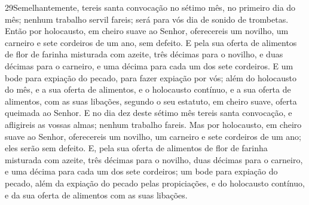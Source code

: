 \medskip

\lettrine{29} Semelhantemente, tereis santa convocação no
sétimo mês, no primeiro dia do mês; nenhum trabalho servil fareis;
será para vós dia de sonido de trombetas. Então por holocausto,
em cheiro suave ao Senhor, oferecereis um novilho, um carneiro e
sete cordeiros de um ano, sem defeito. E pela sua oferta de
alimentos de flor de farinha misturada com azeite, três décimas para
o novilho, e duas décimas para o carneiro, e uma décima para
cada um dos sete cordeiros. E um bode para expiação do pecado,
para fazer expiação por vós; além do holocausto do mês, e a sua
oferta de alimentos, e o holocausto contínuo, e a sua oferta de
alimentos, com as suas libações, segundo o seu estatuto, em cheiro
suave, oferta queimada ao Senhor. E no dia dez deste sétimo mês
tereis santa convocação, e afligireis as vossas almas; nenhum
trabalho fareis. Mas por holocausto, em cheiro suave ao Senhor,
oferecereis um novilho, um carneiro e sete cordeiros de um ano; eles
serão sem defeito. E, pela sua oferta de alimentos de flor de
farinha misturada com azeite, três décimas para o novilho, duas
décimas para o carneiro, e uma décima para cada um dos sete
cordeiros; um bode para expiação do pecado, além da expiação
do pecado pelas propiciações, e do holocausto contínuo, e da sua
oferta de alimentos com as suas libações.

